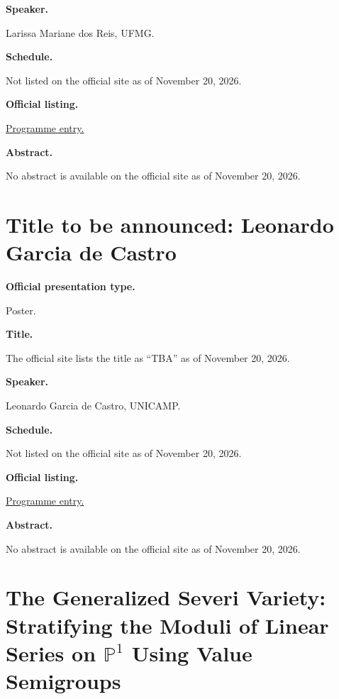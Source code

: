 \medskip\noindent
{\bf Speaker.}

Larissa Mariane dos Reis, UFMG.

\medskip\noindent
{\bf Schedule.}

Not listed on the official site as of
November 20, 2026.

\medskip\noindent
{\bf Official listing.}

\href{%
https://sites.google.com/view/%
geoalgcompluff/legal/%
legal-2027-resumos#h.f3btoqn8ykd7%
}{Programme entry.}

\medskip\noindent
{\bf Abstract.}

No abstract is available on the
official site as of November 20, 2026.

\section{Title to be announced: Leonardo
Garcia de Castro}
\label{section-tba-poster-castro}

\medskip\noindent
{\bf Official presentation type.}

Poster.

\medskip\noindent
{\bf Title.}

The official site lists the title as
``TBA'' as of November 20, 2026.

\medskip\noindent
{\bf Speaker.}

Leonardo Garcia de Castro, UNICAMP.

\medskip\noindent
{\bf Schedule.}

Not listed on the official site as of
November 20, 2026.

\medskip\noindent
{\bf Official listing.}

\href{%
https://sites.google.com/view/%
geoalgcompluff/legal/%
legal-2027-resumos#h.f3btoqn8ykd7%
}{Programme entry.}

\medskip\noindent
{\bf Abstract.}

No abstract is available on the
official site as of November 20, 2026.

\section{The Generalized Severi Variety:
Stratifying the Moduli of Linear Series on
$\mathbb{P}^1$ Using Value Semigroups}
\label{section-the-generalized-severi}

